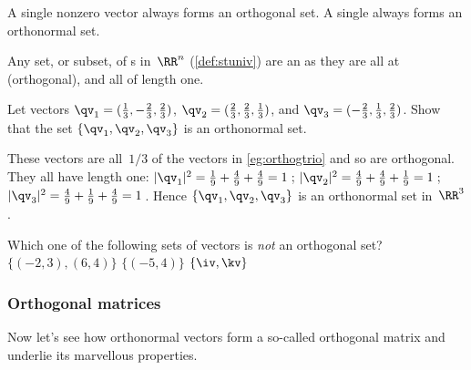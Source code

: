 A single nonzero vector always forms an orthogonal set.  
A single  always forms an orthonormal set.


\begin{example} 
Any set, or subset, of s in~\(\RR^n\) (\cref{def:stuniv}) are an  as they are all at  (orthogonal), and all of length one.
\end{example}

\begin{example} 
Let vectors \(\qv_1=(\frac13,-\frac23,\frac23)\), \(\qv_2=(\frac23,\frac23,\frac13)\), and \(\qv_3=(-\frac23,\frac13,\frac23)\).  
Show that the set \(\{\qv_1,\qv_2,\qv_3\}\) is an orthonormal set.
\begin{solution} 
These vectors are all~\(1/3\) of the vectors in \cref{eg:orthogtrio} and so are orthogonal.
They all have length one:
\(|\qv_1|^2={\frac19+\frac49+\frac49}=1\)\,;
\(|\qv_2|^2={\frac49+\frac49+\frac19}=1\)\,;
\(|\qv_3|^2={\frac49+\frac19+\frac49}=1\)\,.
Hence \(\{\qv_1,\qv_2,\qv_3\}\) is an orthonormal set in~\(\RR^3\). 
\end{solution}
\end{example}



\begin{activity}
Which one of the following sets of vectors is \emph{not} an orthogonal set?
{\(\{(-2,3),(6,4)\}\)}
{\(\{(-5,4)\}\)}
{\(\{\iv,\kv\}\)}
\end{activity}





\subsubsection{Orthogonal matrices}

Now let's see how orthonormal vectors form a so-called orthogonal matrix and underlie its marvellous properties.

